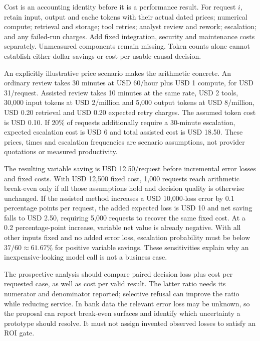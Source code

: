 \label{exec14:cost-development}

Cost is an accounting identity before it is a performance result. For
request \(i\), retain input, output and cache tokens with their actual
dated prices; numerical compute; retrieval and storage; tool retries;
analyst review and rework; escalation; and any failed-run charges. Add
fixed integration, security and maintenance costs separately. Unmeasured
components remain missing. Token counts alone cannot establish either
dollar savings or cost per usable causal decision.

An explicitly illustrative price scenario makes the arithmetic concrete.
An ordinary review takes 30 minutes at USD 60/hour plus USD 1 compute,
for USD 31/request. Assisted review takes 10 minutes at the same rate,
USD 2 tools, 30,000 input tokens at USD 2/million and 5,000 output
tokens at USD 8/million, USD 0.20 retrieval and USD 0.20 expected retry
charges. The assumed token cost is USD 0.10. If 20\% of requests
additionally require a 30-minute escalation, expected escalation cost is
USD 6 and total assisted cost is USD 18.50. These prices, times and
escalation frequencies are scenario assumptions, not provider quotations
or measured productivity.

The resulting variable saving is USD 12.50/request before incremental
error losses and fixed costs. With USD 12,500 fixed cost, 1,000 requests
reach arithmetic break-even only if all those assumptions hold and
decision quality is otherwise unchanged. If the assisted method
increases a USD 10,000-loss error by 0.1 percentage points per request,
the added expected loss is USD 10 and net saving falls to USD 2.50,
requiring 5,000 requests to recover the same fixed cost. At a 0.2
percentage-point increase, variable net value is already negative. With
all other inputs fixed and no added error loss, escalation probability
must be below \(37/60\approx61.67\%\) for positive variable savings.
These sensitivities explain why an inexpensive-looking model call is not
a business case. \citep{exec14_evaluation_oracle}

The prospective analysis should compare paired decision loss plus cost
per requested case, as well as cost per valid result. The latter ratio
needs its numerator and denominator reported; selective refusal can
improve the ratio while reducing service. In bank data the relevant
error loss may be unknown, so the proposal can report break-even
surfaces and identify which uncertainty a prototype should resolve. It
must not assign invented observed losses to satisfy an ROI gate.

